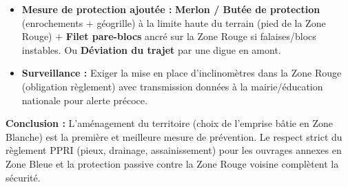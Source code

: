 \documentclass[11pt]{article}
\begin{document}
\begin{exoresolu}
\begin{enumerate}
\begin{itemize}
                \item \textbf{Mesure de protection ajoutée :} \textbf{Merlon / Butée de protection} (enrochements + géogrille) à la limite haute du terrain (pied de la Zone Rouge) + \textbf{Filet pare-blocs} ancré sur la Zone Rouge si falaises/blocs instables. Ou \textbf{Déviation du trajet} par une digue en amont.
                \item \textbf{Surveillance :} Exiger la mise en place d'inclinomètres dans la Zone Rouge (obligation règlement) avec transmission données à la mairie/éducation nationale pour alerte précoce.
            \end{itemize}
    \end{enumerate}
    \textbf{Conclusion :} L'aménagement du territoire (choix de l'emprise bâtie en Zone Blanche) est la première et meilleure mesure de prévention. Le respect strict du règlement PPRI (pieux, drainage, assainissement) pour les ouvrages annexes en Zone Bleue et la protection passive contre la Zone Rouge voisine complètent la sécurité.
\end{exoresolu}
\end{document}
